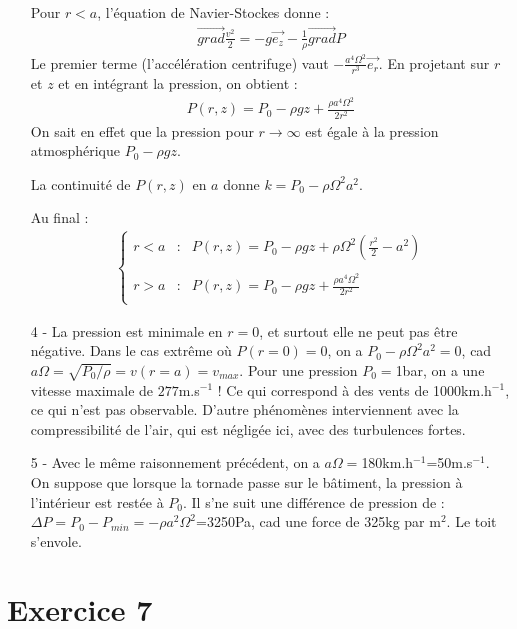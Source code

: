 \documentclass{report}
\begin{document}
\begin{itemize}
Pour $r<a$, l'équation de Navier-Stockes donne : 
\begin{align*}
\vec{grad}\frac{v^2}{2}=-g\vec{e_z}-\frac{1}{\rho}\vec{grad}P
\end{align*}
	Le premier terme (l'accélération centrifuge) vaut $-\frac{a^4\Omega^2}{r^3}\vec{e_r}$. En projetant sur $r$ et $z$ et en intégrant la pression, on obtient :
	\begin{align*}
		P(r,z) = P_0 -\rho g z+ \frac{\rho a^4\Omega^2}{2r^2}
	\end{align*}
	On sait en effet que la pression pour $r\longrightarrow\infty$ est égale à la pression atmosphérique $P_0-\rho gz$.
	
La continuité de $P(r,z)$ en $a$ donne $k=P_0-\rho \Omega^2a^2$.

Au final :
\begin{align*}
	\left\lbrace
\begin{array}{ccc}
r<a & : & P(r,z) = P_0 -\rho g z +\rho\Omega^2(\frac{r^2}{2} -a^2) \\
 & & \\
r>a & : & P(r,z) = P_0 -\rho g z+ \frac{\rho a^4\Omega^2}{2r^2} \\
\end{array}\right.
\end{align*}

\item[4 - ] La pression est minimale en $r=0$, et surtout elle ne peut pas être négative. Dans le cas extrême où $P(r=0)=0$, on a $P_0-\rho\Omega^2a^2=0$, cad $a\Omega=\sqrt{P_0/\rho}=v(r=a)=v_{max}$.
Pour une pression $P_0=$1bar, on a une vitesse maximale de $277$m.s$^{-1}$ ! Ce qui correspond à des vents de 1000km.h$^{-1}$, ce qui n'est pas observable. D'autre phénomènes interviennent avec la compressibilité de l'air, qui est négligée ici, avec des turbulences fortes.

\item[5 - ] Avec le même raisonnement précédent, on a $a\Omega=$180km.h$^{-1}$=50m.s$^{-1}$. On suppose que lorsque la tornade passe sur le bâtiment, la pression à l'intérieur est restée à $P_0$. Il s'ne suit une différence de pression de : $\Delta P = P_0 -P_{min}=-\rho a^2\Omega^2$=3250Pa, cad une force de 325kg par m$^2$. Le toit s'envole.

\end{itemize}

\newpage

\section*{Exercice 7}
\end{document}
